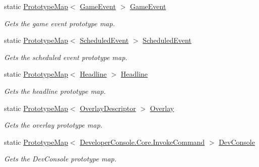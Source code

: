 \begin{DoxyCompactItemize}
static \hyperlink{class_prototype_map}{Prototype\+Map}$<$ \hyperlink{class_game_event}{Game\+Event} $>$ \hyperlink{class_prototype_manager_a2b3ce5adb222fc3f513a018dd708a0d6}{Game\+Event}
\begin{DoxyCompactList}\small\item\em Gets the game event prototype map. \end{DoxyCompactList}\item 
static \hyperlink{class_prototype_map}{Prototype\+Map}$<$ \hyperlink{class_scheduler_1_1_scheduled_event}{Scheduled\+Event} $>$ \hyperlink{class_prototype_manager_a8d8abbd54a569dc1729ed5b67e53e204}{Scheduled\+Event}
\begin{DoxyCompactList}\small\item\em Gets the scheduled event prototype map. \end{DoxyCompactList}\item 
static \hyperlink{class_prototype_map}{Prototype\+Map}$<$ \hyperlink{class_headline}{Headline} $>$ \hyperlink{class_prototype_manager_abc0a929a1a2b353bdbd750118809bff2}{Headline}
\begin{DoxyCompactList}\small\item\em Gets the headline prototype map. \end{DoxyCompactList}\item 
static \hyperlink{class_prototype_map}{Prototype\+Map}$<$ \hyperlink{class_overlay_descriptor}{Overlay\+Descriptor} $>$ \hyperlink{class_prototype_manager_af27377d0797489482144202f7d376baa}{Overlay}
\begin{DoxyCompactList}\small\item\em Gets the overlay prototype map. \end{DoxyCompactList}\item 
static \hyperlink{class_prototype_map}{Prototype\+Map}$<$ \hyperlink{class_developer_console_1_1_core_1_1_invoke_command}{Developer\+Console.\+Core.\+Invoke\+Command} $>$ \hyperlink{class_prototype_manager_a977c115543de50e74e63ab5e581212f1}{Dev\+Console}
\begin{DoxyCompactList}\small\item\em Gets the Dev\+Console prototype map. \end{DoxyCompactList}\item 

\end{DoxyCompactItemize}
